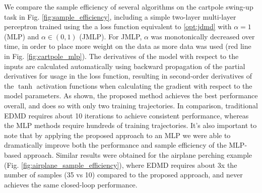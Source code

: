 \documentclass[../root.tex]{subfiles}
\newcommand{\changed}[1]{{\color{black} #1}}
\begin{document}
\changed{We compare the sample efficiency of several algorithms on the cartpole swing-up task in Fig. 
\ref{fig:sample_efficiency}, including a simple two-layer multi-layer perceptron trained using the a loss function
equivalent to \eqref{opt:jdmd} with $\alpha = 1$ (MLP) and $\alpha \in (0,1)$ (JMLP). For JMLP, $\alpha$ was 
monotonically decreased over time, in order to place more weight on the data as more data was used 
(red line in Fig. \ref{fig:cartpole_mlp}).
The derivatives of the model
with respect to the inputs are calculated automatically using backward propagation of the partial derivatives 
for usage in the loss function, resulting in second-order derivatives of the $\tanh$ activation functions when 
calculating the gradient with respect to the model parameters.
As shown, the proposed method achieves the best performance overall, and does so
with only two training trajectories. In comparison, traditional EDMD requires about 10 iterations to achieve 
consistent performance, whereas the MLP methods require hundreds of training trajectories. It's also important 
to note that by applying the proposed approach to an MLP we were 
able to dramatically improve both the performance and sample efficiency of the MLP-based approach.
Similar results were obtained for the airplane perching example (Fig. \ref{fig:airplane_sample_efficiency}),
where EDMD requires about 3x the number of samples (35 vs 10) compared to the proposed approach, and never achieves the same closed-loop performance.}

\end{document}
